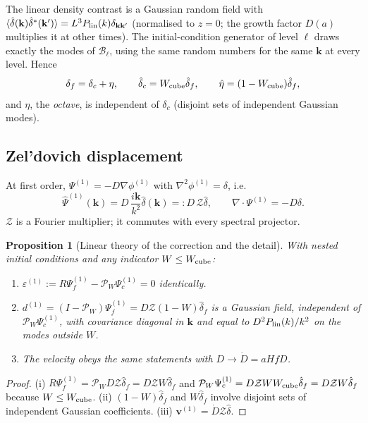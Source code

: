\documentclass[11pt]{article}
\newtheorem{proposition}{Proposition}[section]
\theoremstyle{definition}
\newcommand{\kk}{\mathbf{k}}
\newcommand{\PW}{\mathcal{P}_W}
\newcommand{\lin}{{\rm lin}}
\newcommand{\Zel}{\mathcal{Z}}
\begin{document}
The linear density contrast is a Gaussian random field with $\langle\hat\delta(\kk)\hat\delta^*(\kk')\rangle=L^3P_\lin(k)\delta_{\kk\kk'}$ (normalised to $z=0$; the growth factor $D(a)$ multiplies it at other times). The initial-condition generator of level $\ell$ draws exactly the modes of $\mathcal B_\ell$, using the same random numbers for the same $\kk$ at every level. Hence
\begin{equation}
\delta_f=\delta_c+\eta,\qquad \hat\delta_c=W_{\rm cube}\hat\delta_f,\qquad \hat\eta=(1-W_{\rm cube})\hat\delta_f ,
\label{eq:nested}
\end{equation}
and $\eta$, the \emph{octave}, is independent of $\delta_c$ (disjoint sets of independent Gaussian modes).

\subsection{Zel'dovich displacement}

At first order, $\Psi^{(1)}=-D\nabla\phi^{(1)}$ with $\nabla^2\phi^{(1)}=\delta$, i.e.
\begin{equation}
\hat\Psi^{(1)}(\kk)=D\,\frac{i\kk}{k^2}\hat\delta(\kk)=:D\,\Zel\hat\delta ,\qquad \nabla\cdot\Psi^{(1)}=-D\delta .
\label{eq:zel}
\end{equation}
$\Zel$ is a Fourier multiplier; it commutes with every spectral projector.

\begin{proposition}[Linear theory of the correction and the detail]\label{prop:linear}
With nested initial conditions and any indicator $W\le W_{\rm cube}$:
\begin{enumerate}
\item[(i)] $\varepsilon^{(1)}:=R\Psi^{(1)}_f-\PW\Psi^{(1)}_c=0$ identically.
\item[(ii)] $d^{(1)}=(I-\PW)\Psi_f^{(1)}=D\Zel(1-W)\hat\delta_f$ is a Gaussian field, independent of $\PW\Psi_c^{(1)}$, with covariance diagonal in $\kk$ and equal to $D^2P_\lin(k)/k^2$ on the modes outside $W$.
\item[(iii)] The velocity obeys the same statements with $D\to \dot D=aHfD$.
\end{enumerate}
\end{proposition}
\begin{proof}
(i) $R\Psi^{(1)}_f=\PW D\Zel\hat\delta_f=D\Zel W\hat\delta_f$ and $\PW\Psi^{(1)}_c=D\Zel WW_{\rm cube}\hat\delta_f=D\Zel W\hat\delta_f$ because $W\le W_{\rm cube}$. (ii) $(1-W)\hat\delta_f$ and $W\hat\delta_f$ involve disjoint sets of independent Gaussian coefficients. (iii) $\mathbf v^{(1)}=\dot D\Zel\hat\delta$.
\end{proof}
\end{document}
